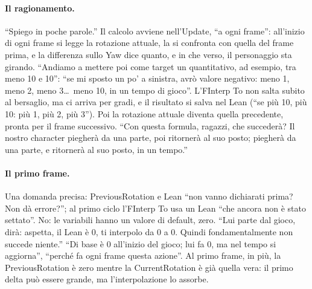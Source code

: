 \paragraph{Il ragionamento.} ``Spiego in poche parole.'' Il calcolo avviene nell'Update,
``a ogni frame'': all'inizio di ogni frame si legge la rotazione attuale, la si confronta
con quella del frame prima, e la differenza sullo Yaw dice quanto, e in che verso, il
personaggio sta girando. ``Andiamo a mettere poi come target un quantitativo, ad esempio,
tra meno 10 e 10'': ``se mi sposto un po' a sinistra, avrò valore negativo: meno 1, meno 2,
meno 3\dots\ meno 10, in un tempo di gioco''. L'FInterp To non salta subito al bersaglio,
ma ci arriva per gradi, e il risultato si salva nel Lean (``se più 10, più 10: più 1, più 2,
più 3''). Poi la rotazione attuale diventa quella precedente, pronta per il frame
successivo. ``Con questa formula, ragazzi, che succederà? Il nostro character piegherà da
una parte, poi ritornerà al suo posto; piegherà da una parte, e ritornerà al suo posto, in
un tempo.''

\paragraph{Il primo frame.} Una domanda precisa: PreviousRotation e Lean ``non vanno
dichiarati prima? Non dà errore?''; al primo ciclo l'FInterp To usa un Lean ``che ancora
non è stato settato''. No: le variabili hanno un valore di default, zero. ``Lui parte dal
gioco, dirà: aspetta, il Lean è 0, ti interpolo da 0 a 0. Quindi fondamentalmente non
succede niente.'' ``Di base è 0 all'inizio del gioco; lui fa 0, ma nel tempo si aggiorna'',
``perché fa ogni frame questa azione''. Al primo frame, in più, la PreviousRotation è zero
mentre la CurrentRotation è già quella vera: il primo delta può essere grande, ma
l'interpolazione lo assorbe.

